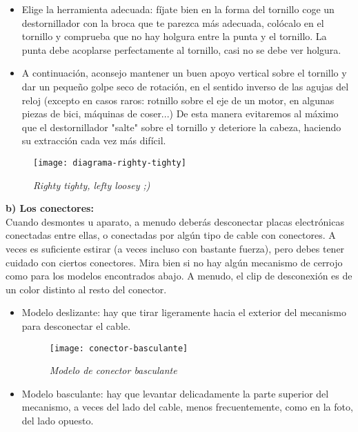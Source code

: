 \begin{itemize}
\item Elige la herramienta adecuada: fíjate bien en la forma del tornillo
coge un destornillador con la broca que te parezca más adecuada, colócalo en el tornillo y comprueba que no hay holgura entre la punta y el tornillo.
La punta debe acoplarse perfectamente al tornillo, casi no se debe ver holgura.
\item A continuación, aconsejo mantener un buen apoyo vertical sobre el tornillo y dar un pequeño golpe seco de rotación, en el sentido inverso de las agujas del reloj (excepto en casos raros: rotnillo sobre el eje de un motor, en algunas piezas de bici, máquinas de coser...)
De esta manera evitaremos al máximo que el destornillador "salte" sobre el tornillo y deteriore la cabeza, haciendo su extracción cada vez más difícil.
\end{itemize}
\begin{figure}[h]
\texttt{[image: diagrama-righty-tighty]} 
\centering
\caption*{\textit{Righty tighty, lefty loosey ;)}}
\end{figure}

{\large \textbf{b) Los conectores:}}\\
Cuando desmontes u aparato, a menudo deberás desconectar placas electrónicas conectadas entre ellas, o conectadas por algún tipo de cable con conectores. A veces es suficiente estirar (a veces incluso con bastante fuerza), pero debes tener cuidado con ciertos conectores. Mira bien si no hay algún mecanismo de cerrojo como para los modelos encontrados abajo. A menudo, el clip de desconexión es de un color distinto al resto del conector.

\begin{itemize}


\begin{figure}[h]
\texttt{[image: conector-deslizante]} 
\centering
\caption*{\textit{Modelo de conector deslizante}}
\end{figure}
\item Modelo deslizante: hay que tirar ligeramente hacia el exterior del mecanismo para desconectar el cable.
\begin{figure}[h]
\texttt{[image: conector-basculante]} 
\centering
\caption*{\textit{Modelo de conector basculante}}
\end{figure}
\item Modelo basculante: hay que levantar delicadamente la parte superior del mecanismo, a veces del lado del cable, menos frecuentemente, como en la foto, del lado opuesto.
\end{itemize}

